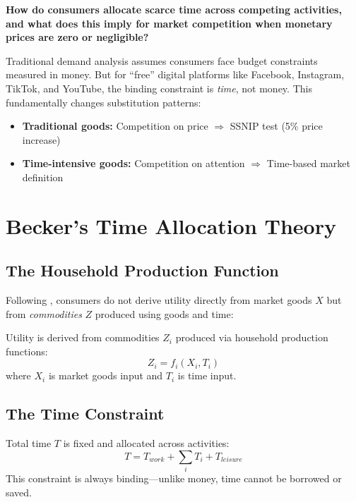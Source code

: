 \begin{tcolorbox}[colback=yellow!10!white, colframe=orange!75!black,
    title=Central Question]
\textbf{How do consumers allocate scarce time across competing activities, and what does this imply for market competition when monetary prices are zero or negligible?}
\end{tcolorbox}

Traditional demand analysis assumes consumers face budget constraints measured in money. But for ``free'' digital platforms like Facebook, Instagram, TikTok, and YouTube, the binding constraint is \textit{time}, not money. This fundamentally changes substitution patterns:

\begin{itemize}
\item \textbf{Traditional goods:} Competition on price $\Rightarrow$ SSNIP test (5\% price increase)
\item \textbf{Time-intensive goods:} Competition on attention $\Rightarrow$ Time-based market definition
\end{itemize}

\section{Becker's Time Allocation Theory}
\label{sec:pt-time-constraint}

\subsection{The Household Production Function}

Following \citet{becker1965theory}, consumers do not derive utility directly from market goods $X$ but from \textit{commodities} $Z$ produced using goods and time:

\begin{axiom}
\label{ax:ta-household}
Utility is derived from commodities $Z_i$ produced via household production functions:
\[
Z_i = f_i(X_i, T_i)
\]
where $X_i$ is market goods input and $T_i$ is time input.
\end{axiom}

\subsection{The Time Constraint}

\begin{axiom}
\label{ax:ta-time}
Total time $T$ is fixed and allocated across activities:
\[
T = T_{work} + \sum_i T_i + T_{leisure}
\]
This constraint is always binding---unlike money, time cannot be borrowed or saved.
\end{axiom}

